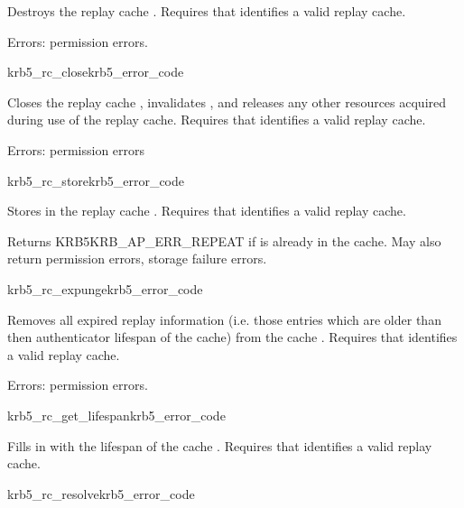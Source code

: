 Destroys the replay cache .
Requires that  identifies a valid replay cache.

Errors: permission errors.

\begin{funcdecl}{krb5_rc_close}{krb5_error_code}{\funcin}
\end{funcdecl}

Closes the replay cache , invalidates ,
and releases any other resources acquired during use of the replay cache.
Requires that  identifies a valid replay cache.

Errors: permission errors

\begin{funcdecl}{krb5_rc_store}{krb5_error_code}{\funcin}
\end{funcdecl}
Stores  in the replay cache .
Requires that  identifies a valid replay cache.

Returns KRB5KRB_AP_ERR_REPEAT if  is already in the
cache.  May also return permission errors, storage failure errors.

\begin{funcdecl}{krb5_rc_expunge}{krb5_error_code}{\funcin}
\end{funcdecl}
Removes all expired replay information (i.e. those entries which are
older than then authenticator lifespan of the cache) from the cache
.  Requires that  identifies a valid replay
cache.

Errors: permission errors.

\begin{funcdecl}{krb5_rc_get_lifespan}{krb5_error_code}{\funcin}
\funcout
{}
\end{funcdecl}
Fills in  with the lifespan of
the cache .
Requires that  identifies a valid replay cache.

\begin{funcdecl}{krb5_rc_resolve}{krb5_error_code}{\funcinout}
\funcin
{}
\end{funcdecl}

